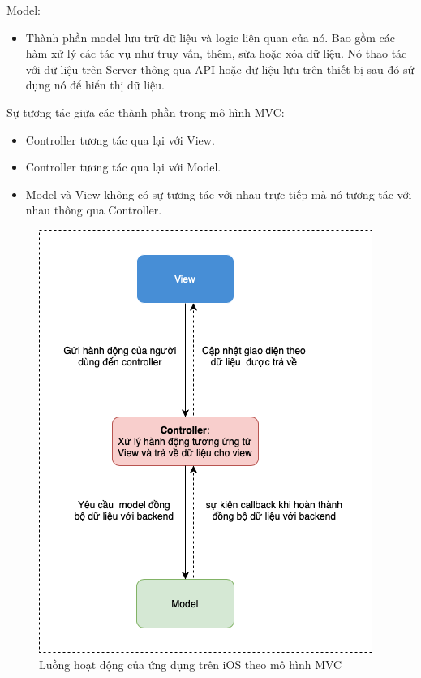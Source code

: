 \documentclass[../DoAn.tex]{subfiles}
\begin{document}
Model:
\begin{itemize}
    \item Thành phần model lưu trữ dữ liệu và logic liên quan của nó. Bao gồm các hàm xử lý các tác vụ như truy vấn, thêm, sửa hoặc xóa dữ liệu. Nó thao tác với dữ liệu trên Server thông qua API hoặc dữ liệu lưu trên thiết bị sau đó sử dụng nó để hiển thị dữ liệu.
\end{itemize}
Sự tương tác giữa các thành phần trong mô hình MVC:
\begin{itemize}
    \item Controller tương tác qua lại với View.
    \item Controller tương tác qua lại với Model.
    \item Model và View không có sự tương tác với nhau trực tiếp mà nó tương tác với nhau thông qua Controller.
\end{itemize}

\begin{figure}[H]
    \centering
    \includegraphics[width=1\linewidth]{Hinhve/Architecture/iOS_Client_Data_Flow.png}
    \caption{Luồng hoạt động của ứng dụng trên iOS theo mô hình MVC}
    \label{fig:use_case_tổng_quan}
\end{figure}
\end{document}
